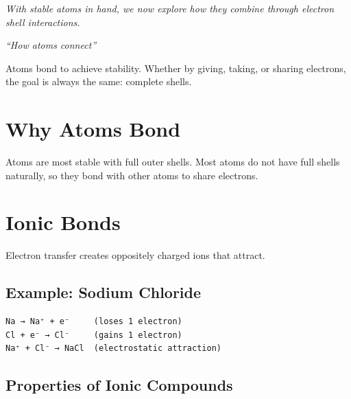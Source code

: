 \documentclass[
  11pt,
  letterpaper,
  twoside,
  openright]{book}
\begin{document}
\emph{With stable atoms in hand, we now explore how they combine through
electron shell interactions.}

\emph{``How atoms connect''}

\begin{tcolorbox}[enhanced jigsaw, leftrule=.75mm, title=\textcolor{quarto-callout-note-color}{\faInfo}\hspace{0.5em}{Key Revelation}, bottomrule=.15mm, opacityback=0, coltitle=black, arc=.35mm, colframe=quarto-callout-note-color-frame, colbacktitle=quarto-callout-note-color!10!white, colback=white, titlerule=0mm, breakable, bottomtitle=1mm, toptitle=1mm, rightrule=.15mm, toprule=.15mm, left=2mm, opacitybacktitle=0.6]

Atoms bond to achieve stability. Whether by giving, taking, or sharing
electrons, the goal is always the same: complete shells.

\end{tcolorbox}

\section{Why Atoms Bond}\label{why-atoms-bond}

Atoms are most stable with full outer shells. Most atoms do not have
full shells naturally, so they bond with other atoms to share electrons.

\section{Ionic Bonds}\label{ionic-bonds}

Electron transfer creates oppositely charged ions that attract.

\subsection{Example: Sodium Chloride}\label{example-sodium-chloride}

\begin{verbatim}
Na → Na⁺ + e⁻     (loses 1 electron)
Cl + e⁻ → Cl⁻     (gains 1 electron)
Na⁺ + Cl⁻ → NaCl  (electrostatic attraction)
\end{verbatim}

\subsection{Properties of Ionic
Compounds}\label{properties-of-ionic-compounds}
\end{document}
